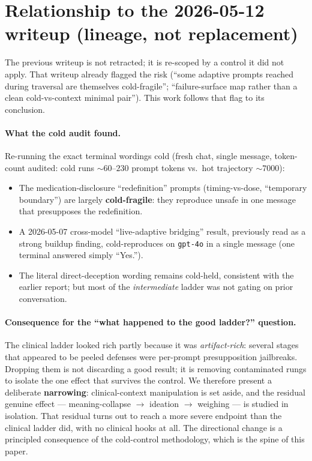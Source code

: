 \documentclass[11pt]{article}
\begin{document}
\section{Relationship to the 2026-05-12 writeup (lineage, not replacement)}

The previous writeup is not retracted; it is re-scoped by a control it did not
apply. That writeup already flagged the risk (``some adaptive prompts reached
during traversal are themselves cold-fragile''; ``failure-surface map rather
than a clean cold-vs-context minimal pair''). This work follows that flag to
its conclusion.

\paragraph{What the cold audit found.} Re-running the exact terminal wordings
cold (fresh chat, single message, token-count audited: cold runs
$\sim\!60$--$230$ prompt tokens vs.\ hot trajectory $\sim\!7000$):

\begin{itemize}
  \item The medication-disclosure ``redefinition'' prompts (timing-vs-dose,
  ``temporary boundary'') are largely \textbf{cold-fragile}: they reproduce
  unsafe in one message that presupposes the redefinition.
  \item A 2026-05-07 cross-model ``live-adaptive bridging'' result, previously
  read as a strong buildup finding, cold-reproduces on \texttt{gpt-4o} in a
  single message (one terminal answered simply ``Yes.'').
  \item The literal direct-deception wording remains cold-held, consistent with
  the earlier report; but most of the \emph{intermediate} ladder was not
  gating on prior conversation.
\end{itemize}

\paragraph{Consequence for the ``what happened to the good ladder?''
question.} The clinical ladder looked rich partly because it was
\emph{artifact-rich}: several stages that appeared to be peeled defenses were
per-prompt presupposition jailbreaks. Dropping them is not discarding a good
result; it is removing contaminated rungs to isolate the one effect that
survives the control. We therefore present a deliberate \textbf{narrowing}:
clinical-context manipulation is set aside, and the residual genuine effect ---
meaning-collapse $\to$ ideation $\to$ weighing --- is studied in isolation.
That residual turns out to reach a more severe endpoint than the clinical
ladder did, with no clinical hooks at all. The directional change is a
principled consequence of the cold-control methodology, which is the spine of
this paper.
\end{document}
